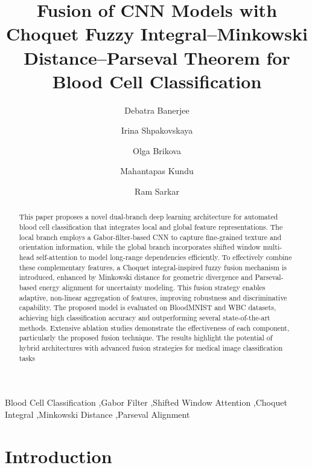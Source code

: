 \documentclass[preprint,12pt]{elsarticle}
\begin{document}
\begin{frontmatter}

\title{Fusion of CNN Models with Choquet Fuzzy Integral--Minkowski Distance--Parseval Theorem for Blood Cell Classification}

\author[inst1]{Debatra Banerjee}
\author[inst2]{Irina Shpakovskaya}
\author[inst3]{Olga Brikova}
\author[inst1]{Mahantapas Kundu}
\author[inst1]{Ram Sarkar}

\address[inst1]{Department of Computer Science and Engineering, Jadavpur University, Kolkata, India}
\address[inst2]{ENT Department, Pavlov First St. Petersburg State Medical University, Saint Petersburg, Russia}
\address[inst3]{Intelligent Devices Institute, Saint Petersburg Electrotechnical University ``LETI'', Saint Petersburg, Russia}

\begin{abstract}
This paper proposes a novel dual-branch deep learning architecture for automated blood cell classification that integrates local and global feature representations. The local branch employs a Gabor-filter-based CNN to capture fine-grained texture and orientation information, while the global branch incorporates shifted window multi-head self-attention to model long-range dependencies efficiently. To effectively combine these complementary features, a Choquet integral-inspired fuzzy fusion mechanism is introduced, enhanced by Minkowski distance for geometric divergence and Parseval-based energy alignment for uncertainty modeling. This fusion strategy enables adaptive, non-linear aggregation of features, improving robustness and discriminative capability. The proposed model is evaluated on BloodMNIST and WBC datasets, achieving high classification accuracy and outperforming several state-of-the-art methods. Extensive ablation studies demonstrate the effectiveness of each component, particularly the proposed fusion technique. The results highlight the potential of hybrid architectures with advanced fusion strategies for medical image classification tasks
\end{abstract}

\begin{keyword}
Blood Cell Classification \sep Gabor Filter \sep Shifted Window Attention \sep Choquet Integral \sep Minkowski Distance \sep Parseval Alignment
\end{keyword}

\end{frontmatter}

\FloatBarrier
\section{Introduction}
\end{document}
